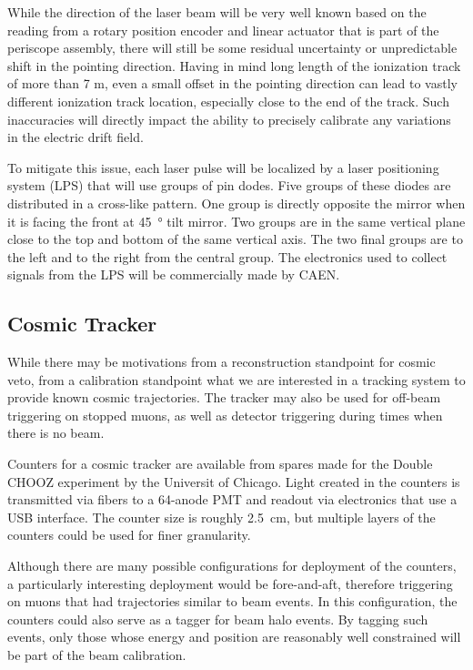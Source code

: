 While the direction of the laser beam will be very well known based on the
reading from a rotary position encoder and linear actuator that is part of the
periscope assembly, there will still be some residual uncertainty or
unpredictable shift in the pointing direction.  Having in mind long length of
the ionization track of more than 7 m, even a small offset in the pointing
direction can lead to vastly different ionization track location, especially
close to the end of the track. Such inaccuracies will directly impact the
ability to precisely calibrate any variations in the electric drift field.

To mitigate this issue, each laser pulse will be localized by a laser
positioning system (LPS) that will use groups of pin dodes.  Five groups of
these diodes are distributed in a cross-like pattern.  One group is directly
opposite the mirror when it is facing the front at \SI{45}{\degree} tilt mirror.  Two
groups are in the same vertical plane close to the top and bottom of the same
vertical axis. The two final groups are to the left and to the right from the
central group. The electronics used to collect signals from the LPS will be
commercially made by CAEN. 


\subsection{Cosmic Tracker}

	While there may be motivations from a reconstruction standpoint for
cosmic veto, from a calibration standpoint what we are interested in a tracking
system to provide known cosmic trajectories.  The tracker may also be used for
off-beam triggering on stopped muons, as well as detector triggering during
times when there is no beam.  

	Counters for a cosmic tracker are available from spares made for the
Double CHOOZ experiment by the Universit of Chicago. Light created in the
counters is transmitted via fibers to a 64-anode PMT and readout via
electronics that use a USB interface.  The counter size is roughly 2.5~cm, but
multiple layers of the counters could be used for finer granularity.

	Although there are many possible configurations for deployment of the
counters, a particularly interesting deployment would be fore-and-aft,
therefore triggering on muons that had trajectories similar to beam events. In
this configuration, the counters could also serve as a tagger for beam halo
events.  By tagging such events, only those whose energy and position are
reasonably well constrained will be part of the beam calibration.

